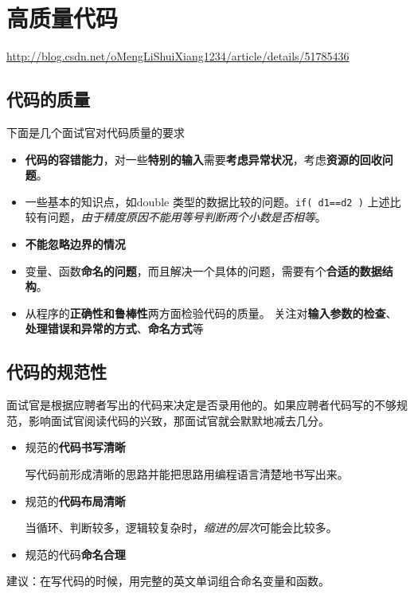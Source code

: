 \documentclass[UTF8,a4paper,12pt]{ctexbook}
\begin{document}
	\section{高质量代码}
		\url{http://blog.csdn.net/oMengLiShuiXiang1234/article/details/51785436}
		\subsection{代码的质量}
			下面是几个面试官对代码质量的要求
			\begin{itemize}
				\item \textbf{代码的容错能力}，对一些\textbf{特别的输入}需要\textbf{考虑异常状况}，考虑\textbf{资源的回收问题}。
				
				\item 一些基本的知识点，如double 类型的数据比较的问题。\verb|if( d1==d2 )| 
				上述比较有问题，\textit{由于精度原因不能用等号判断两个小数是否相等}。
				
				\item \textbf{不能忽略边界的情况}
				
				\item 变量、函数\textbf{命名的问题}，而且解决一个具体的问题，需要有个\textbf{合适的数据结构}。
				
				\item 从程序的\textbf{正确性和鲁棒性}两方面检验代码的质量。 关注对\textbf{输入参数的检查}、\textbf{处理错误和异常的方式}、\textbf{命名方式}等			
			\end{itemize}
		\subsection{代码的规范性}
			面试官是根据应聘者写出的代码来决定是否录用他的。如果应聘者代码写的不够规范，影响面试官阅读代码的兴致，那面试官就会默默地减去几分。
			\begin{itemize}
				\item 规范的\textbf{代码书写清晰}
			
				写代码前形成清晰的思路并能把思路用编程语言清楚地书写出来。
			
				\item 规范的\textbf{代码布局清晰}
			
				当循环、判断较多，逻辑较复杂时，\textit{缩进的层次}可能会比较多。
			
				\item 规范的代码\textbf{命名合理}
			\end{itemize}
			
			建议：在写代码的时候，用完整的英文单词组合命名变量和函数。	
			
\end{document}
